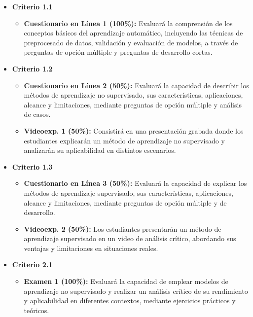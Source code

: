 \documentclass[a4,11pt]{aleph-notas}
\begin{document}
\begin{itemize}[leftmargin=*]
    \item \textbf{Criterio 1.1}
        \begin{itemize}[leftmargin=*]
            \item \textbf{Cuestionario en Línea 1 (100\%):} Evaluará la comprensión de los conceptos básicos del aprendizaje automático, incluyendo las técnicas de preprocesado de datos, validación y evaluación de modelos, a través de preguntas de opción múltiple y preguntas de desarrollo cortas.
        \end{itemize}
    \item \textbf{Criterio 1.2}
        \begin{itemize}[leftmargin=*]
            \item \textbf{Cuestionario en Línea 2 (50\%):} Evaluará la capacidad de describir los métodos de aprendizaje no supervisado, sus características, aplicaciones, alcance y limitaciones, mediante preguntas de opción múltiple y análisis de casos.
            \item \textbf{Videoexp. 1 (50\%):} Consistirá en una presentación grabada donde los estudiantes explicarán un método de aprendizaje no supervisado y analizarán su aplicabilidad en distintos escenarios.
        \end{itemize}
    \item \textbf{Criterio 1.3}
        \begin{itemize}[leftmargin=*]
            \item \textbf{Cuestionario en Línea 3 (50\%):} Evaluará la capacidad de explicar los métodos de aprendizaje supervisado, sus características, aplicaciones, alcance y limitaciones, mediante preguntas de opción múltiple y de desarrollo.
            \item \textbf{Videoexp. 2 (50\%):} Los estudiantes presentarán un método de aprendizaje supervisado en un video de análisis crítico, abordando sus ventajas y limitaciones en situaciones reales.
        \end{itemize}
    \item \textbf{Criterio 2.1}
        \begin{itemize}[leftmargin=*]
            \item \textbf{Examen 1 (100\%):} Evaluará la capacidad de emplear modelos de aprendizaje no supervisado y realizar un análisis crítico de su rendimiento y aplicabilidad en diferentes contextos, mediante ejercicios prácticos y teóricos.
        \end{itemize}

\end{itemize}
\end{document}
